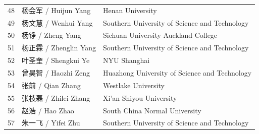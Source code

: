 \documentclass[12pt,a4paper,twoside,UTF8,fontset=none]{ctexart}
\begin{document}
\begin{longtable}{@{}C{0.9cm}L{5.0cm}L{8.8cm}@{}}
48 & 杨会军 / Huijun Yang & Henan University\\
49 & 杨文慧 / Wenhui Yang & Southern University of Science and Technology\\
50 & 杨铮 / Zheng Yang & Sichuan University Auckland College\\
51 & 杨正霖 / Zhenglin Yang & Southern University of Science and Technology\\
52 & 叶圣奎 / Shengkui Ye & NYU Shanghai\\
53 & 曾昊智 / Haozhi Zeng & Huazhong University of Science and Technology\\
54 & 张前 / Qian Zhang & Westlake University\\
55 & 张枝磊 / Zhilei Zhang & Xi'an Shiyou University\\
56 & 赵浩 / Hao Zhao & South China Normal University\\
57 & 朱一飞 / Yifei Zhu & Southern University of Science and Technology\\
\end{longtable}\normalsize
\end{document}
